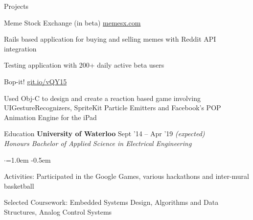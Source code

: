 \documentclass{resume} %
\begin{document}
	
	
	\begin{rSection}{Projects}
		\begin{rSubsection}{Meme Stock Exchange (in beta)}
			{\href{https://memesx.com}{memesx.com}}
			{}{}
			
			\item Rails based application for buying and selling memes with Reddit API integration
			\item Testing application with 200+ daily active beta users
			
		\end{rSubsection}
		\begin{rSubsection}{Bop-it!}
			{\href{https://git.io/vQY15}{git.io/vQY15}}
			{}{}
			
			\item Used Obj-C to design and create a reaction based game involving UIGestureRecognizers, SpriteKit Particle Emitters and Facebook's POP Animation Engine for the iPad
		\end{rSubsection}
		
		
		
		
	\end{rSection}
	
	
	\begin{rSection}{Education}
		{\bf University of Waterloo} \hfill {Sept '14 -- Apr '19 \em (expected)} \\
		{\em Honours Bachelor of Applied Science in Electrical Engineering} 
		\begin{list}{$\cdot$}{\leftmargin=1.0em}
			\itemsep -0.5em \vspace{-0.5em}
			\item Activities: Participated in the Google Games, various hackathons and inter-mural basketball
			\item Selected Coursework: Embedded Systems Design, Algorithms and Data Structures, Analog Control Systems
		\end{list}
		\vspace{0.5em}
	\end{rSection}
	
\end{document}
